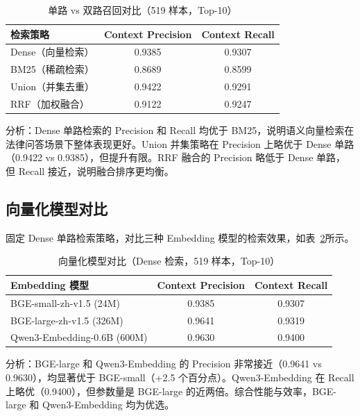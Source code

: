 \documentclass[12pt, a4paper]{article}
\begin{document}
\begin{table}[H]
\centering
\caption{单路 vs 双路召回对比（519 样本，Top-10）}
\label{tab:retrieval_compare}
\begin{tabular}{lcc}
\toprule
\textbf{检索策略} & \textbf{Context Precision} & \textbf{Context Recall} \\
\midrule
Dense（向量检索）      & 0.9385 & 0.9307 \\
BM25（稀疏检索）       & 0.8689 & 0.8599 \\
Union（并集去重）      & 0.9422 & 0.9291 \\
RRF（加权融合）        & 0.9122 & 0.9247 \\
\bottomrule
\end{tabular}
\end{table}

分析：Dense 单路检索的 Precision 和 Recall 均优于 BM25，说明语义向量检索在法律问答场景下整体表现更好。Union 并集策略在 Precision 上略优于 Dense 单路（0.9422 vs 0.9385），但提升有限。RRF 融合的 Precision 略低于 Dense 单路，但 Recall 接近，说明融合排序更均衡。

\subsection{向量化模型对比}

固定 Dense 单路检索策略，对比三种 Embedding 模型的检索效果，如表~\ref{tab:model_compare}所示。

\begin{table}[H]
\centering
\caption{向量化模型对比（Dense 检索，519 样本，Top-10）}
\label{tab:model_compare}
\begin{tabular}{lcc}
\toprule
\textbf{Embedding 模型} & \textbf{Context Precision} & \textbf{Context Recall} \\
\midrule
BGE-small-zh-v1.5 (24M)     & 0.9385 & 0.9307 \\
BGE-large-zh-v1.5 (326M)    & 0.9641 & 0.9319 \\
Qwen3-Embedding-0.6B (600M) & 0.9630 & 0.9400 \\
\bottomrule
\end{tabular}
\end{table}

分析：BGE-large 和 Qwen3-Embedding 的 Precision 非常接近（0.9641 vs 0.9630），均显著优于 BGE-small（+2.5 个百分点）。Qwen3-Embedding 在 Recall 上略优（0.9400），但参数量是 BGE-large 的近两倍。综合性能与效率，BGE-large 和 Qwen3-Embedding 均为优选。
\end{document}
